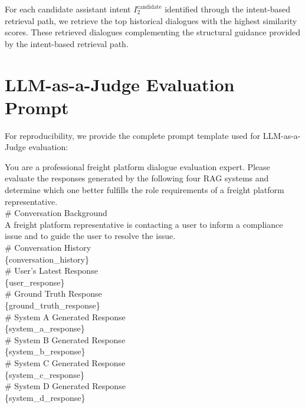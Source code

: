 \documentclass[
]{style/ceurart}
\begin{document}
For each candidate assistant intent $I^{\text{candidate}}_2$ identified through the intent-based retrieval path, we retrieve the top historical dialogues with the highest similarity scores. These retrieved dialogues complementing the structural guidance provided by the intent-based retrieval path.

\section{LLM-as-a-Judge Evaluation Prompt}
\label{judge_prompt}
For reproducibility, we provide the complete prompt template used for LLM-as-a-Judge evaluation:
\begin{tcolorbox}[colback=gray!5, colframe=gray!50]
\fontsize{8pt}{11pt}\selectfont %

You are a professional freight platform dialogue evaluation expert. Please evaluate the responses generated by the following four RAG systems and determine which one better fulfills the role requirements of a freight platform representative.\\

\# Conversation Background\\
A freight platform representative is contacting a user to inform a compliance issue and to guide the user to resolve the issue.\\

\# Conversation History\\
\{conversation\_history\}\\

\# User's Latest Response\\
\{user\_response\}\\

\# Ground Truth Response \\
\{ground\_truth\_response\}\\

\# System A Generated Response\\
\{system\_a\_response\}\\
\# System B Generated Response\\
\{system\_b\_response\}\\
\# System C Generated Response\\
\{system\_c\_response\}\\
\# System D Generated Response\\
\{system\_d\_response\}\\


\end{tcolorbox}
\end{document}
